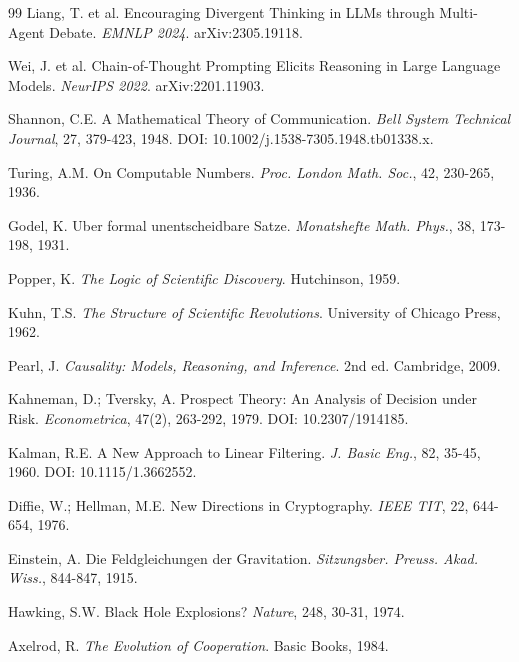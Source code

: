 \documentclass[5p]{elsarticle}
\begin{document}
\begin{thebibliography}{99}
Liang, T. et al. Encouraging Divergent Thinking in LLMs through Multi-Agent Debate. \textit{EMNLP 2024}. arXiv:2305.19118.

Wei, J. et al. Chain-of-Thought Prompting Elicits Reasoning in Large Language Models. \textit{NeurIPS 2022}. arXiv:2201.11903.

Shannon, C.E. A Mathematical Theory of Communication. \textit{Bell System Technical Journal}, 27, 379-423, 1948. DOI: 10.1002/j.1538-7305.1948.tb01338.x.

Turing, A.M. On Computable Numbers. \textit{Proc. London Math. Soc.}, 42, 230-265, 1936.

Godel, K. Uber formal unentscheidbare Satze. \textit{Monatshefte Math. Phys.}, 38, 173-198, 1931.

Popper, K. \textit{The Logic of Scientific Discovery}. Hutchinson, 1959.

Kuhn, T.S. \textit{The Structure of Scientific Revolutions}. University of Chicago Press, 1962.

Pearl, J. \textit{Causality: Models, Reasoning, and Inference}. 2nd ed. Cambridge, 2009.

Kahneman, D.; Tversky, A. Prospect Theory: An Analysis of Decision under Risk. \textit{Econometrica}, 47(2), 263-292, 1979. DOI: 10.2307/1914185.

Kalman, R.E. A New Approach to Linear Filtering. \textit{J. Basic Eng.}, 82, 35-45, 1960. DOI: 10.1115/1.3662552.

Diffie, W.; Hellman, M.E. New Directions in Cryptography. \textit{IEEE TIT}, 22, 644-654, 1976.

Einstein, A. Die Feldgleichungen der Gravitation. \textit{Sitzungsber. Preuss. Akad. Wiss.}, 844-847, 1915.

Hawking, S.W. Black Hole Explosions? \textit{Nature}, 248, 30-31, 1974.

Axelrod, R. \textit{The Evolution of Cooperation}. Basic Books, 1984.

\end{thebibliography}
\end{document}
